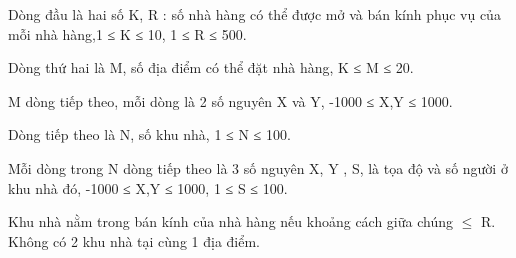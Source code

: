 Dòng đầu là hai số K, R : số nhà hàng có thể được mở và bán kính phục vụ của mỗi nhà hàng,1 ≤ K ≤ 10, 1 ≤ R ≤ 500.  

   Dòng thứ hai là M, số địa điểm có thể đặt nhà hàng, K ≤ M ≤ 20.  

   M dòng tiếp theo, mỗi dòng là 2 số nguyên X và Y, -1000 ≤ X,Y ≤ 1000.  

   Dòng tiếp theo là N, số khu nhà, 1 ≤ N ≤ 100.  

   Mỗi dòng trong N dòng tiếp theo là 3 số nguyên  X, Y , S,  là tọa độ và số người ở khu nhà đó, -1000 ≤ X,Y ≤ 1000, 1 ≤ S ≤ 100.  

   Khu nhà nằm trong bán kính của nhà hàng nếu khoảng cách giữa chúng  $\le$  R. Không có 2 khu nhà tại cùng 1 địa điểm.
